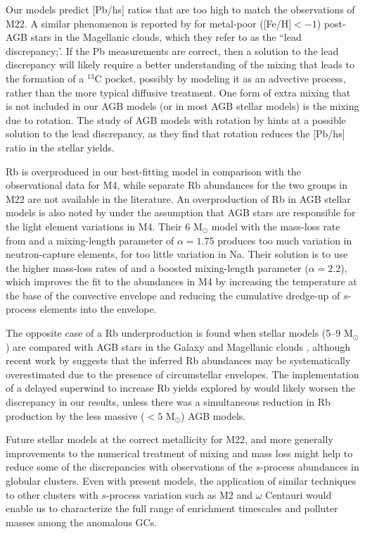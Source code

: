 Our models predict [Pb/hs] ratios that are too high to match the observations of M22. A similar phenomenon is reported by \citet{DeSmedt:2014hd} for metal-poor ([Fe/H]$<-1$) post-AGB stars in the Magellanic clouds, which they refer to as the ``lead discrepancy;'. If the Pb measurements are correct, then a solution to the lead discrepancy will likely require a better understanding of the mixing that leads to the formation of a $^{13}$C pocket, possibly by modeling it as an advective process, rather than the more typical diffusive treatment. One form of extra mixing that is not included in our AGB models (or in most AGB stellar models) is the mixing due to rotation. The study of AGB models with rotation by \citet{Piersanti:2013dh} hints at a possible solution to the lead discrepancy, as they find that rotation reduces the [Pb/hs] ratio in the stellar yields.

Rb is overproduced in our best-fitting model in comparison with the observational data for M4, while separate Rb abundances for the two groups in M22 are not available in the literature. An overproduction of Rb in AGB stellar models is also noted by \citet{DOrazi:2013jr} under the assumption that AGB stars are responsible for the light element variations in M4. Their 6 M$_\odot$ model with the mass-loss rate from \citet{Vassiliadis:1993jk} and a mixing-length parameter of $\alpha = 1.75$ produces too much variation in neutron-capture elements, for too little variation in Na. Their solution is to use the higher mass-loss rates of \citet{Bloecker:1995ui} and a boosted mixing-length parameter ($\alpha = 2.2$), which improves the fit to the abundances in M4 by increasing the temperature at the base of the convective envelope and reducing the cumulative dredge-up of $s$-process elements into the envelope.

The opposite case of a Rb underproduction is found when stellar models (5--9 M$_\odot$) are compared with AGB stars in the Galaxy and Magellanic clouds \citep{vanRaai:2012fq,Karakas:2012kc}, although recent work by \citet{Zamora:2014ch} suggests that the inferred Rb abundances may be systematically overestimated due to the presence of circumstellar envelopes. The implementation of a delayed superwind to increase Rb yields explored by \citet{Karakas:2012kc} would likely worsen the discrepancy in our results, unless there was a simultaneous reduction in Rb production by the less massive ($<5$ M$_\odot$) AGB models.

Future stellar models at the correct metallicity for M22, and more generally improvements to the numerical treatment of mixing and mass loss might help to reduce some of the discrepancies with observations of the $s$-process abundances in globular clusters. Even with present models, the application of similar techniques to other clusters with $s$-process variation such as M2 \citep{Yong:2014dq} and $\omega$ Centauri would enable us to characterize the full range of enrichment timescales and polluter masses among the anomalous GCs.

